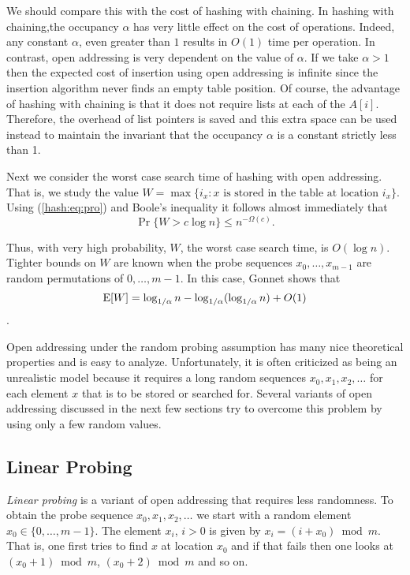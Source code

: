 We should compare this with the cost of hashing with chaining.  In
hashing with chaining,the occupancy $\alpha$ has very little effect on
the cost of operations.  Indeed, any constant $\alpha$, even greater
than $1$ results in $O(1)$ time per operation.  In contrast, open
addressing is very dependent on the value of $\alpha$.  If we take
$\alpha>1$ then the expected cost of insertion using open addressing
is infinite since the insertion algorithm never finds an empty table
position.  Of course, the advantage of hashing with chaining is that
it does not require lists at each of the $A[i]$.  Therefore, the
overhead of list pointers is saved and this extra space can be used
instead to maintain the invariant that the occupancy $\alpha$ is a
constant strictly less than 1.

Next we consider the worst case search time of hashing with open
addressing.  That is, we study the value $W=\max\{i_x: \mbox{$x$ is
stored in the table at location $i_x$}\}$.  Using (\ref{hash:eq:pro}) and Boole's
inequality it follows almost immediately that 
\[
  \Pr\{W > c\log n\} \le n^{-\Omega(c)} .
\]

Thus, with very high probability, $W$, the worst case search time, is
$O(\log n)$.  Tighter bounds on $W$ are known when the probe sequences
$x_0,\ldots,x_{m-1}$ are random permutations of $0,\ldots,m-1$.  In this
case, Gonnet shows that
\[
  \mathrm{E}[W]=\log_{1/\alpha} n - \log_{1/\alpha}(\log_{1/\alpha} n) + O(1)
\]
\cite{g81}. 

Open addressing under the random probing assumption has many nice
theoretical properties and is easy to analyze.  Unfortunately, it is
often criticized as being an unrealistic model because it requires a
long random sequences $x_0,x_1,x_2,\ldots$ for each element $x$ that
is to be stored or searched for.  Several variants of open addressing
discussed in the next few sections try to overcome this problem by
using only a few random values. 


\subsection{Linear Probing}
 
\emph{Linear probing} is a variant of open addressing that requires less
randomness.  To obtain the probe sequence $x_0,x_1,x_2,\ldots$ we
start with a random element $x_0\in \{0,\ldots,m-1\}$.  The element
$x_i$, $i>0$ is given by $x_i=(i+x_0)\bmod m$.  That is, one first
tries to find $x$ at location $x_0$ and if that fails then one looks
at $(x_0+1)\bmod m$, $(x_0+2)\bmod m$ and so on.  


